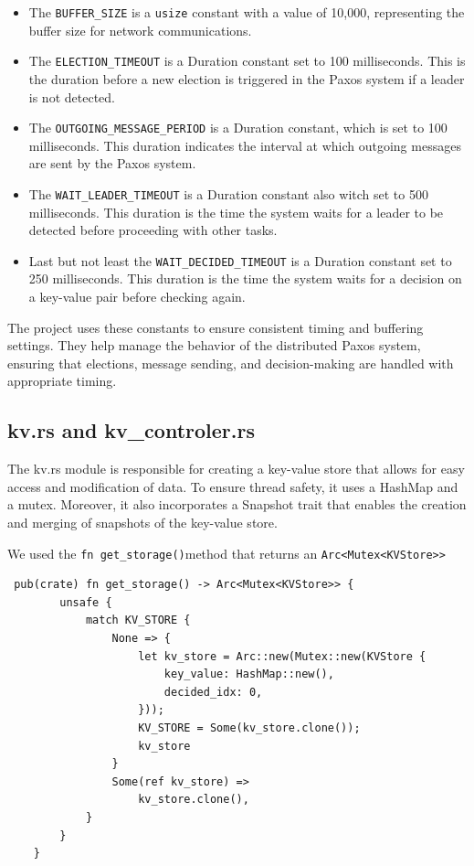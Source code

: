 \documentclass[a4paper, 11pt]{article}
\begin{document}
\begin{itemize}
    \item The \verb|BUFFER_SIZE| is a \verb|usize| constant with a value of 10,000, representing the buffer size for network communications.
    \item The \verb|ELECTION_TIMEOUT| is a Duration constant set to 100 milliseconds. This is the duration before a new election is triggered in the Paxos system if a leader is not detected.
    \item The \verb|OUTGOING_MESSAGE_PERIOD| is a Duration constant, which is set to 100 milliseconds. This duration indicates the interval at which outgoing messages are sent by the Paxos system.
    \item The \verb|WAIT_LEADER_TIMEOUT| is a Duration constant also witch set to 500 milliseconds. This duration is the time the system waits for a leader to be detected before proceeding with other tasks.
    \item Last but not least the \verb|WAIT_DECIDED_TIMEOUT| is a Duration constant set to 250 milliseconds. This duration is the time the system waits for a decision on a key-value pair before checking again.
\end{itemize}
\par
The project uses these constants to ensure consistent timing and buffering settings. They help manage the behavior of the distributed Paxos system, ensuring that elections, message sending, and decision-making are handled with appropriate timing.


\subsection{kv.rs and kv\_controler.rs}
The kv.rs module is responsible for creating a key-value store that allows for easy access and modification of data. To ensure thread safety, it uses a HashMap and a mutex. Moreover, it also incorporates a Snapshot trait that enables the creation and merging of snapshots of the key-value store.\par
We used the \verb|fn get_storage()|method that returns an \verb|Arc<Mutex<KVStore>>|

\begin{verbatim}
 pub(crate) fn get_storage() -> Arc<Mutex<KVStore>> {
        unsafe {
            match KV_STORE {
                None => {
                    let kv_store = Arc::new(Mutex::new(KVStore {
                        key_value: HashMap::new(),
                        decided_idx: 0,
                    }));
                    KV_STORE = Some(kv_store.clone());
                    kv_store
                }
                Some(ref kv_store) =>
                    kv_store.clone(),
            }
        }
    }
    
\end{verbatim}
\end{document}
